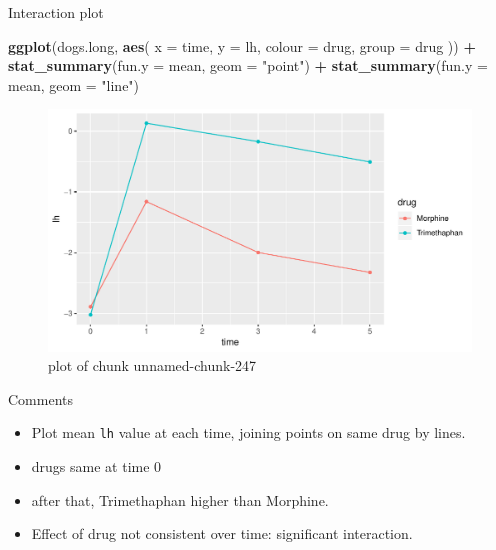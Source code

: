 \documentclass[ignorenonframetext,]{beamer}
\newenvironment{Shaded}{\begin{snugshade}}{\end{snugshade}}
\newcommand{\DataTypeTok}[1]{\textcolor[rgb]{0.13,0.29,0.53}{#1}}
\newcommand{\KeywordTok}[1]{\textcolor[rgb]{0.13,0.29,0.53}{\textbf{#1}}}
\newcommand{\NormalTok}[1]{#1}
\newcommand{\OperatorTok}[1]{\textcolor[rgb]{0.81,0.36,0.00}{\textbf{#1}}}
\newcommand{\StringTok}[1]{\textcolor[rgb]{0.31,0.60,0.02}{#1}}
\begin{document}
\begin{frame}[fragile]{Interaction plot}
\protect\hypertarget{interaction-plot-3}{}

\begin{Shaded}
\begin{Highlighting}[]
\KeywordTok{ggplot}\NormalTok{(dogs.long, }\KeywordTok{aes}\NormalTok{(}
  \DataTypeTok{x =}\NormalTok{ time, }\DataTypeTok{y =}\NormalTok{ lh,}
  \DataTypeTok{colour =}\NormalTok{ drug, }\DataTypeTok{group =}\NormalTok{ drug}
\NormalTok{)) }\OperatorTok{+}
\StringTok{  }\KeywordTok{stat_summary}\NormalTok{(}\DataTypeTok{fun.y =}\NormalTok{ mean, }\DataTypeTok{geom =} \StringTok{"point"}\NormalTok{) }\OperatorTok{+}
\StringTok{  }\KeywordTok{stat_summary}\NormalTok{(}\DataTypeTok{fun.y =}\NormalTok{ mean, }\DataTypeTok{geom =} \StringTok{"line"}\NormalTok{)}
\end{Highlighting}
\end{Shaded}

\begin{figure}
\centering
\includegraphics{figure/unnamed-chunk-247-1.pdf}
\caption{plot of chunk unnamed-chunk-247}
\end{figure}

\end{frame}

\begin{frame}[fragile]{Comments}
\protect\hypertarget{comments-15}{}

\begin{itemize}
\item
  Plot mean \texttt{lh} value at each time, joining points on same drug
  by lines.
\item
  drugs same at time 0
\item
  after that, Trimethaphan higher than Morphine.
\item
  Effect of drug not consistent over time: significant interaction.
\end{itemize}

\end{frame}
\end{document}

